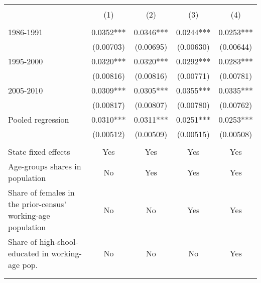 \begin{tabular}{lrrrr}
\toprule &       &       &       &  \\
      & \multicolumn{1}{c}{(1)} & \multicolumn{1}{c}{(2)} & \multicolumn{1}{c}{(3)} & \multicolumn{1}{c}{(4)} \bigstrut[b]\\
\cline{2-5}      &       &       &       &  \bigstrut[t]\\
     1986-1991 & \multicolumn{1}{c}{0.0352***} & \multicolumn{1}{c}{0.0346***} & \multicolumn{1}{c}{0.0244***} & \multicolumn{1}{c}{0.0253***} \\
      & \multicolumn{1}{c}{(0.00703)} & \multicolumn{1}{c}{(0.00695)} & \multicolumn{1}{c}{(0.00630)} & \multicolumn{1}{c}{(0.00644)} \\
     1995-2000 & \multicolumn{1}{c}{0.0320***} & \multicolumn{1}{c}{0.0320***} & \multicolumn{1}{c}{0.0292***} & \multicolumn{1}{c}{0.0283***} \\
      & \multicolumn{1}{c}{(0.00816)} & \multicolumn{1}{c}{(0.00816)} & \multicolumn{1}{c}{(0.00771)} & \multicolumn{1}{c}{(0.00781)} \\
     2005-2010 & \multicolumn{1}{c}{0.0309***} & \multicolumn{1}{c}{0.0305***} & \multicolumn{1}{c}{0.0355***} & \multicolumn{1}{c}{0.0335***} \\
      & \multicolumn{1}{c}{(0.00817)} & \multicolumn{1}{c}{(0.00807)} & \multicolumn{1}{c}{(0.00780)} & \multicolumn{1}{c}{(0.00762)} \\
     Pooled regression & \multicolumn{1}{c}{0.0310***} & \multicolumn{1}{c}{0.0311***} & \multicolumn{1}{c}{0.0251***} & \multicolumn{1}{c}{0.0253***} \\
      & \multicolumn{1}{c}{(0.00512)} & \multicolumn{1}{c}{(0.00509)} & \multicolumn{1}{c}{(0.00515)} & \multicolumn{1}{c}{(0.00508)} \\
      &       &       &       &  \\
State fixed effects & \multicolumn{1}{c}{Yes} & \multicolumn{1}{c}{Yes} & \multicolumn{1}{c}{Yes} & \multicolumn{1}{c}{Yes} \\
Age-groups shares in population & \multicolumn{1}{c}{No} & \multicolumn{1}{c}{Yes} & \multicolumn{1}{c}{Yes} & \multicolumn{1}{c}{Yes} \\
Share of females in the prior-census' working-age population & \multicolumn{1}{c}{No} & \multicolumn{1}{c}{No} & \multicolumn{1}{c}{Yes} & \multicolumn{1}{c}{Yes} \\
Share of high-shool-educated in working-age pop. & \multicolumn{1}{c}{No} & \multicolumn{1}{c}{No} & \multicolumn{1}{c}{No} & \multicolumn{1}{c}{Yes} \\
      &       &       &       &  \\
\bottomrule &       &       &       &  \\
\end{tabular}%
